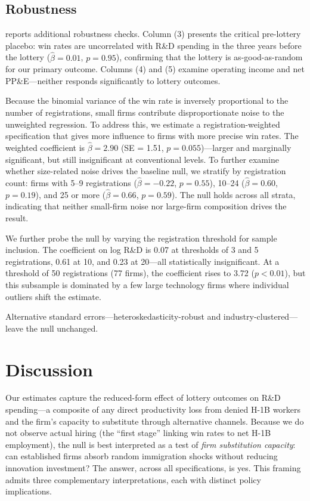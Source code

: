 \documentclass[12pt]{article}
\begin{document}
\subsection{Robustness}



 reports additional robustness checks. Column (3) presents the critical pre-lottery placebo: win rates are uncorrelated with R\&D spending in the three years before the lottery ($\hat{\beta} = 0.01$, $p = 0.95$), confirming that the lottery is as-good-as-random for our primary outcome. Columns (4) and (5) examine operating income and net PP\&E---neither responds significantly to lottery outcomes.

Because the binomial variance of the win rate is inversely proportional to the number of registrations, small firms contribute disproportionate noise to the unweighted regression. To address this, we estimate a registration-weighted specification that gives more influence to firms with more precise win rates. The weighted coefficient is $\hat{\beta} = 2.90$ (SE = 1.51, $p = 0.055$)---larger and marginally significant, but still insignificant at conventional levels. To further examine whether size-related noise drives the baseline null, we stratify by registration count: firms with 5--9 registrations ($\hat{\beta} = -0.22$, $p = 0.55$), 10--24 ($\hat{\beta} = 0.60$, $p = 0.19$), and 25 or more ($\hat{\beta} = 0.66$, $p = 0.59$). The null holds across all strata, indicating that neither small-firm noise nor large-firm composition drives the result.

We further probe the null by varying the registration threshold for sample inclusion. The coefficient on log R\&D is 0.07 at thresholds of 3 and 5 registrations, 0.61 at 10, and 0.23 at 20---all statistically insignificant. At a threshold of 50 registrations (77 firms), the coefficient rises to 3.72 ($p < 0.01$), but this subsample is dominated by a few large technology firms where individual outliers shift the estimate.

Alternative standard errors---heteroskedasticity-robust and industry-clustered---leave the null unchanged.

\section{Discussion}
\label{sec:discussion}

Our estimates capture the reduced-form effect of lottery outcomes on R\&D spending---a composite of any direct productivity loss from denied H-1B workers and the firm's capacity to substitute through alternative channels. Because we do not observe actual hiring (the ``first stage'' linking win rates to net H-1B employment), the null is best interpreted as a test of \emph{firm substitution capacity}: can established firms absorb random immigration shocks without reducing innovation investment? The answer, across all specifications, is yes. This framing admits three complementary interpretations, each with distinct policy implications.
\end{document}
